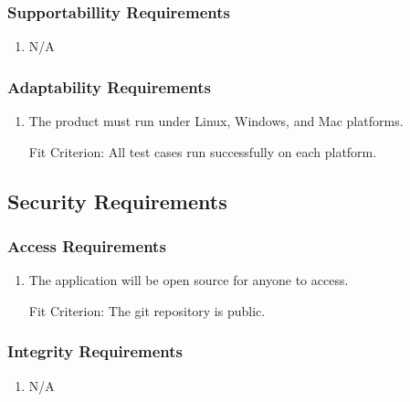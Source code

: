 \documentclass[12pt, titlepage]{article}
\begin{document}
\color{red}

\subsubsection{Supportabillity Requirements}

\begin{enumerate}[label=SUR\arabic*:, wide=0pt, leftmargin=*]
    \item N/A
\end{enumerate}

\color{black}

\subsubsection{Adaptability Requirements}
\begin{enumerate}[label=ADR\arabic*:, wide=0pt, leftmargin=*]
    \item The product must run under Linux, Windows, and Mac platforms.
    \item [Fit Criterion:] All test cases run successfully on each platform.
\end{enumerate}

\subsection{Security Requirements}

\subsubsection{Access Requirements}
\begin{enumerate}[label=ACR\arabic*:, wide=0pt, leftmargin=*]
    \item The application will be open source for anyone to access.
    \item [Fit Criterion:] The git repository is public.
\end{enumerate}

\color{red}

\subsubsection{Integrity Requirements}

\begin{enumerate}[label=IR\arabic*:, wide=0pt, leftmargin=*]
    \item N/A
\end{enumerate}
\end{document}
